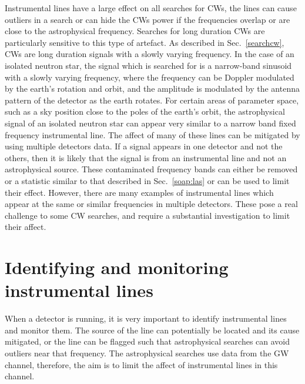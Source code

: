 %

Instrumental lines have a large effect on all searches for \glspl{CW}, the lines can cause outliers in a search or can hide the \glspl{CW} power if the frequencies overlap or are close to the astrophysical frequency.
Searches for long duration \glspl{CW} are particularly sensitive to this type of artefact.  As described in
Sec.~\ref{searchcw}, \glspl{CW} are long duration signals with a slowly varying
frequency.  In the case of an isolated neutron star, the signal which is
searched for is a narrow-band sinusoid with a slowly varying frequency, where the frequency can be Doppler modulated by
the earth's rotation and orbit, and the amplitude is modulated by the antenna pattern of the detector as the earth rotates. For certain areas of parameter space, such as a sky position
close to the poles of the earth's orbit, the astrophysical signal of an isolated neutron star can
appear very similar to a narrow band fixed frequency instrumental line. The affect of many of these lines can be mitigated by using multiple detectors data. If a signal
appears in one detector and not the others, then it is likely that the signal
is from an instrumental line and not an astrophysical source.  These
contaminated frequency bands can either be removed or a statistic similar to
that described in Sec.~\ref{soap:las} or \citep{keitel2014SearchContinuous} can
be used to limit their effect.  However, there are many examples of
instrumental lines which appear at the same or similar frequencies in multiple
detectors.  These pose a real challenge to some \gls{CW} searches, and require
a substantial investigation to limit their affect.

\section{\label{detchar:monitor}Identifying and monitoring instrumental lines}
%

When a detector is running, it is very important to identify instrumental lines
and monitor them.  The source of the line can potentially be located and its cause mitigated, or the line can be flagged such that astrophysical searches can avoid outliers near that frequency.  
The astrophysical searches use data from the \gls{GW} channel, therefore, the aim is to limit the affect of instrumental lines in this channel.

